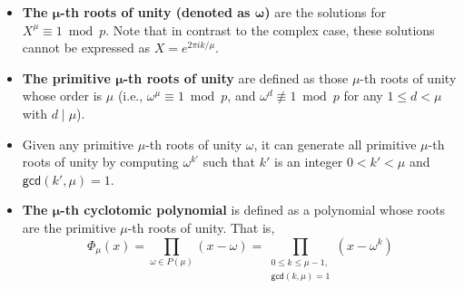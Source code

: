 \begin{tcolorbox}[title={\textbf{\tboxdef{\ref*{sec:cyclotomic-polynomial-integer-ring}} Roots of Unity and Cyclotomic Polynomial over Ring $\mathbb{Z}_p$}}]


\begin{itemize}
\item \textbf{The $\bm \mu$-th roots of unity (denoted as $\bm \omega$)} are the solutions for $X^\mu \equiv 1 \bmod p$. Note that in contrast to the complex case, these solutions cannot be expressed as $X = e^{2 \pi i k / \mu}$. 
\item \textbf{The primitive $\bm \mu$-th roots of unity} are defined as those $\mu$-th roots of unity whose order is $\mu$ (i.e., $\omega^{\mu} \equiv 1 \bmod p$, and $\omega^d \not\equiv 1 \bmod p$ for any $1 \le d < \mu$ with $d \mid \mu$). 
\item Given any primitive $\mu$-th roots of unity $\omega$, it can generate all primitive $\mu$-th roots of unity by computing $\omega^{k'}$ such that $k'$ is an integer $0 < k' < \mu$ and $\textsf{gcd}(k', \mu) = 1$.
\item \textbf{The $\bm \mu$-th cyclotomic polynomial} is defined as a polynomial whose roots are the primitive $\mu$-th roots of unity. That is, \[ \Phi_{\mu}(x) = \prod_{\omega \in P({\mu})} (x - \omega) = \prod_{\substack{0 \leq k \leq {\mu}-1,\\ \textsf{gcd}(k, {\mu}) = 1}} (x - \omega^k) \]
\end{itemize}

\end{tcolorbox}


